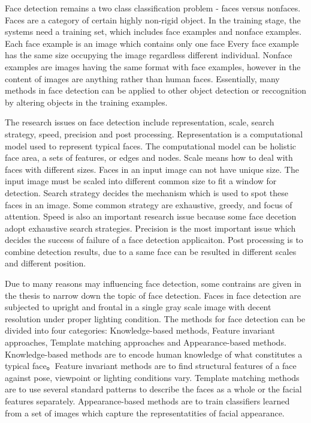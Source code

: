 Face detection remains a two class classification problem - faces versus nonfaces. Faces are a category of certain highly non-rigid object. In the training stage, the systems need a training set, which includes face examples and nonface examples. Each face example is an image which contains only one face Every face example has the same size occupying the image regardless different individual. Nonface examples are images having the same format with face examples, however in the content of images are anything rather than human faces. Essentially, many methods in face detection can be applied to other object detection or reccognition by altering objects in the training examples.

The research issues on face detection include representation, scale, search strategy, speed, precision and post processing. Representation is a computational model used to represent typical faces. The computational model can be holistic face area, a sets of features, or edges and nodes. Scale means how to deal with faces with different sizes. Faces in an input image can not have unique size. The input image must be scaled into different common size to fit a window for detection. Search strategy decides the mechanism which is used to spot these faces in an image. Some common strategy are exhaustive, greedy, and focus of attention. Speed is also an important research issue because some face decetion adopt exhaustive search strategies. Precision is the most important issue which decides the success of failure of a face detection applicaiton. Post processing is to combine detection results, due to a same face can be resulted in different scales and different position.

Due to many reasons may influencing face detection, some contrains are given in the thesis to narrow down the topic of face detection. Faces in face detection are subjected to upright and frontal in a single gray scale image with decent resolution under proper lighting condition. The methods for face detection can be divided into four categories: Knowledge-based methods, Feature invariant approaches, Template matching approaches and Appearance-based methods. Knowledge-based methods are to encode human knowledge of what constitutes a typical face。Feature invariant methods are to find structural features of a face against pose, viewpoint or lighting conditions vary. Template matching methods are to use several standard patterns to describe the faces as a whole or the facial features separately. Appearance-based methods are to train classifiers learned from a set of images which capture the representatities of facial appearance.

